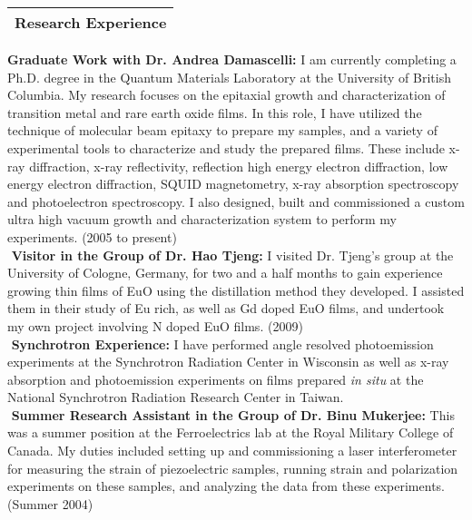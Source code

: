 \documentclass[letterpaper,12pt]{article}
\begin{document}
\noindent \Large \begin{tabular}{|p{12cm}|} \hline \textbf{Research Experience}\\ \hline \end{tabular} \normalsize
\linebreak
\linebreak
\noindent \textbf{Graduate Work with Dr. Andrea Damascelli:} I am currently completing a Ph.D. degree in the Quantum Materials Laboratory at the University of British Columbia. My research focuses on the epitaxial growth and characterization of transition metal and rare earth oxide films. In this role, I have utilized the technique of molecular beam epitaxy to prepare my samples, and a variety of experimental tools to characterize and study the prepared films. These include x-ray diffraction, x-ray reflectivity, reflection high energy electron diffraction, low energy electron diffraction, SQUID magnetometry, x-ray absorption spectroscopy and photoelectron spectroscopy. I also designed, built and commissioned a custom ultra high vacuum growth and characterization system to perform my experiments. (2005 to present) \\
$ $\linebreak
\noindent \textbf{Visitor in the Group of Dr. Hao Tjeng:} I visited Dr. Tjeng's group at the University of Cologne, Germany, for two and a half months to gain experience growing thin films of EuO using the distillation method they developed. I assisted them in their study of Eu rich, as well as Gd doped EuO films, and undertook my own project involving N doped EuO films. (2009) \\
$ $\linebreak
\noindent \textbf{Synchrotron Experience:} I have performed angle resolved photoemission experiments at the Synchrotron Radiation Center in Wisconsin as well as x-ray absorption and photoemission experiments on films prepared \textit{in situ} at the National Synchrotron Radiation Research Center in Taiwan.\\
$ $\linebreak
\noindent \textbf{Summer Research Assistant in the Group of Dr. Binu Mukerjee:} This was a summer position at the Ferroelectrics lab at the Royal Military College of Canada. My duties included setting up and commissioning a laser interferometer for measuring the strain of piezoelectric samples, running strain and polarization experiments on these samples, and analyzing the data from these experiments. (Summer 2004)\\
$ $\linebreak
\end{document}

